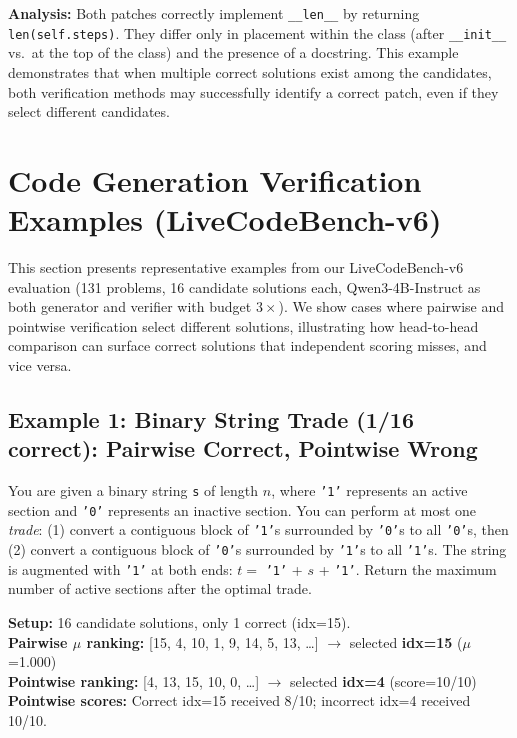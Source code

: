 \noindent\textbf{Analysis:} Both patches correctly implement \texttt{\_\_len\_\_} by returning \texttt{len(self.steps)}. They differ only in placement within the class (after \texttt{\_\_init\_\_} vs.\ at the top of the class) and the presence of a docstring. This example demonstrates that when multiple correct solutions exist among the candidates, both verification methods may successfully identify a correct patch, even if they select different candidates.


\section{Code Generation Verification Examples (LiveCodeBench-v6)}
\label{sec:appendix_code_examples}

This section presents representative examples from our LiveCodeBench-v6 evaluation (131 problems, 16 candidate solutions each, Qwen3-4B-Instruct as both generator and verifier with budget $3\times$). We show cases where pairwise and pointwise verification select different solutions, illustrating how head-to-head comparison can surface correct solutions that independent scoring misses, and vice versa.

\subsection{Example 1: Binary String Trade (1/16 correct): Pairwise Correct, Pointwise Wrong}

\begin{tcolorbox}[
    colback=promptbg,
    colframe=promptborder,
    title={\textbf{Problem: Maximize active sections after at most one trade}},
    coltitle=white,
    fonttitle=\small\bfseries,
    breakable,
    enhanced
]
\small
You are given a binary string \texttt{s} of length $n$, where \texttt{'1'} represents an active section and \texttt{'0'} represents an inactive section. You can perform at most one \emph{trade}: (1) convert a contiguous block of \texttt{'1'}s surrounded by \texttt{'0'}s to all \texttt{'0'}s, then (2) convert a contiguous block of \texttt{'0'}s surrounded by \texttt{'1'}s to all \texttt{'1'}s. The string is augmented with \texttt{'1'} at both ends: $t = $ \texttt{'1'} + $s$ + \texttt{'1'}. Return the maximum number of active sections after the optimal trade.
\end{tcolorbox}

\noindent\textbf{Setup:} 16 candidate solutions, only 1 correct (idx=15).\\
\textbf{Pairwise $\mu$ ranking:} [15, 4, 10, 1, 9, 14, 5, 13, \ldots] $\rightarrow$ selected \textbf{idx=15} ($\mu$=1.000) \checkmark\\
\textbf{Pointwise ranking:} [4, 13, 15, 10, 0, \ldots] $\rightarrow$ selected \textbf{idx=4} (score=10/10) \\
\textbf{Pointwise scores:} Correct idx=15 received 8/10; incorrect idx=4 received 10/10.

